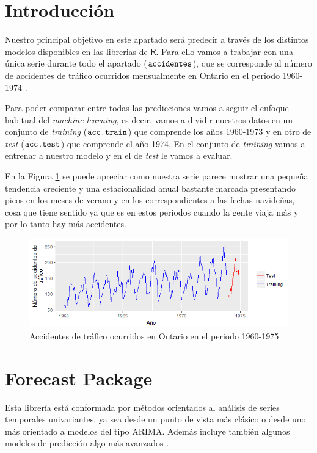\setcounter{section}{0}

\section{Introducción}
Nuestro principal objetivo en este apartado será predecir a través de los distintos modelos disponibles en las librerias de $\textsf{R}$. Para ello vamos a trabajar con una única serie durante todo el apartado ($\verb!accidentes!$), que se corresponde al número de accidentes de tráfico ocurridos mensualmente en Ontario en el periodo 1960-1974 \cite{datamarket}.

Para poder comparar entre todas las predicciones vamos a seguir el enfoque habitual del \textit{machine learning}, es decir, vamos a dividir nuestros datos en un conjunto de \textit{training} ($\verb!acc.train!$) que comprende los años 1960-1973 y en otro de \textit{test} ($\verb!acc.test!$) que comprende el año 1974. En el conjunto de \textit{training} vamos a entrenar a nuestro modelo y en el de \textit{test} le vamos a evaluar.

En la Figura \ref{accidentes} se puede apreciar como nuestra serie parece mostrar una pequeña tendencia creciente y una estacionalidad anual bastante marcada presentando picos en los meses de verano y en los correspondientes a las fechas navideñas, cosa que tiene sentido ya que es en estos periodos cuando la gente viaja más y por lo tanto hay más accidentes.
\begin{figure}
    \centering
    \centerline{\includegraphics[scale = 0.7]{Images/Modelizacion/31.png}}
    \caption{Accidentes de tráfico ocurridos en Ontario en el periodo 1960-1975}
    \label{accidentes}
\end{figure}

\section{Forecast Package}
Esta librería está conformada por métodos orientados al análisis de series temporales univariantes, ya sea desde un punto de vista más clásico o desde uno más orientado a modelos del tipo ARIMA. Además incluye también algunos modelos de predicción algo más avanzados \cite{forecast}.

